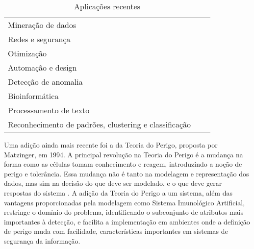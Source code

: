 \begin{table}[h!]
    \vspace{0.5cm}
    \centering
    \caption{Aplicações recentes \cite{Dasgupta2010}}
    \label{ais:applications}
    \begin{tabular}{l c r}
        \\
        \hline
        Mineração de dados                                    \\
        Redes e segurança                                     \\
        Otimização                                            \\
        Automação e design                                    \\
        Detecção de anomalia                                  \\
        Bioinformática                                        \\
        Processamento de texto                                \\
        Reconhecimento de padrões, clustering e classificação \\
        \hline
    \end{tabular}
    \vspace{0.5cm}
\end{table}

Uma adição ainda mais recente foi a da Teoria do Perigo, proposta por Matzinger, em 1994. A principal revolução na Teoria do Perigo é a mudança na forma como as células tomam conhecimento e reagem, introduzindo a noção de perigo e tolerância. Essa mudança não é tanto na modelagem e representação dos dados, mas sim na decisão do que deve ser modelado, e o que deve gerar respostas do sistema \cite{Aickelin2005}. A adição da Teoria do Perigo a um sistema, além das vantagens proporcionadas pela modelagem como Sistema Imunológico Artificial, restringe o domínio do problema, identificando o subconjunto de atributos mais importantes à detecção, e facilita a implementação em ambientes onde a definição de perigo muda com facilidade, características importantes em sistemas de segurança da informação.

\iffalse

\section{Objetivos}
\section{Organização}

\fi
